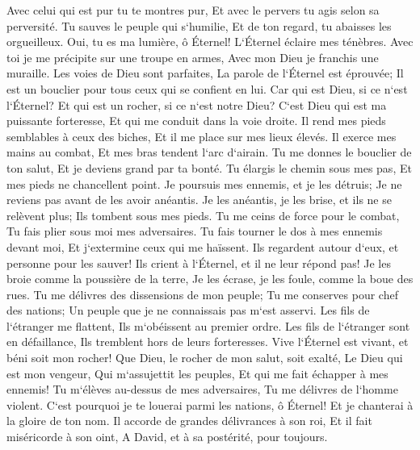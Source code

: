 \verse Avec celui qui est pur tu te montres pur, Et avec le pervers tu agis selon sa perversité. 
\verse Tu sauves le peuple qui s`humilie, Et de ton regard, tu abaisses les orgueilleux. 
\verse Oui, tu es ma lumière, ô Éternel! L`Éternel éclaire mes ténèbres. 
\verse Avec toi je me précipite sur une troupe en armes, Avec mon Dieu je franchis une muraille. 
\verse Les voies de Dieu sont parfaites, La parole de l`Éternel est éprouvée; Il est un bouclier pour tous ceux qui se confient en lui. 
\verse Car qui est Dieu, si ce n`est l`Éternel? Et qui est un rocher, si ce n`est notre Dieu? 
\verse C`est Dieu qui est ma puissante forteresse, Et qui me conduit dans la voie droite. 
\verse Il rend mes pieds semblables à ceux des biches, Et il me place sur mes lieux élevés. 
\verse Il exerce mes mains au combat, Et mes bras tendent l`arc d`airain. 
\verse Tu me donnes le bouclier de ton salut, Et je deviens grand par ta bonté. 
\verse Tu élargis le chemin sous mes pas, Et mes pieds ne chancellent point. 
\verse Je poursuis mes ennemis, et je les détruis; Je ne reviens pas avant de les avoir anéantis. 
\verse Je les anéantis, je les brise, et ils ne se relèvent plus; Ils tombent sous mes pieds. 
\verse Tu me ceins de force pour le combat, Tu fais plier sous moi mes adversaires. 
\verse Tu fais tourner le dos à mes ennemis devant moi, Et j`extermine ceux qui me haïssent. 
\verse Ils regardent autour d`eux, et personne pour les sauver! Ils crient à l`Éternel, et il ne leur répond pas! 
\verse Je les broie comme la poussière de la terre, Je les écrase, je les foule, comme la boue des rues. 
\verse Tu me délivres des dissensions de mon peuple; Tu me conserves pour chef des nations; Un peuple que je ne connaissais pas m`est asservi. 
\verse Les fils de l`étranger me flattent, Ils m`obéissent au premier ordre. 
\verse Les fils de l`étranger sont en défaillance, Ils tremblent hors de leurs forteresses. 
\verse Vive l`Éternel est vivant, et béni soit mon rocher! Que Dieu, le rocher de mon salut, soit exalté, 
\verse Le Dieu qui est mon vengeur, Qui m`assujettit les peuples, 
\verse Et qui me fait échapper à mes ennemis! Tu m`élèves au-dessus de mes adversaires, Tu me délivres de l`homme violent. 
\verse C`est pourquoi je te louerai parmi les nations, ô Éternel! Et je chanterai à la gloire de ton nom. 
\verse Il accorde de grandes délivrances à son roi, Et il fait miséricorde à son oint, A David, et à sa postérité, pour toujours. 

\chapter{}

